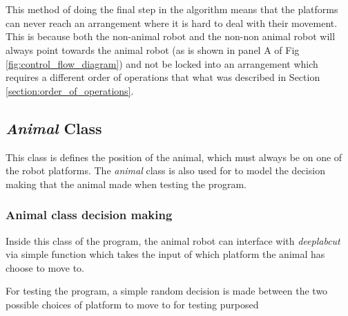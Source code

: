 \\ \\ 

This method of doing the final step in the algorithm means that the platforms can never reach an arrangement where it is hard to deal with their movement. This is because both the non-animal robot and the non-non animal robot will always point towards the animal robot (as is shown in panel A of Fig \ref{fig:control_flow_diagram}) and not be locked into an arrangement which requires a different order of operations that what was described in Section \ref{section:order_of_operations}. 

\pagebreak
\subsection{\textit{Animal} Class}

This class is defines the position of the animal, which must always be on one of the robot platforms. The \textit{animal} class is also used for to model the decision making that the animal made when testing the program.


\subsubsection{Animal class decision making}

Inside this class of the program, the animal robot can interface with \textit{deeplabcut} via simple function which takes the input of which platform the animal has choose to move to.

For testing the program, a simple random decision is made between the two possible choices of platform to move to for testing purposed